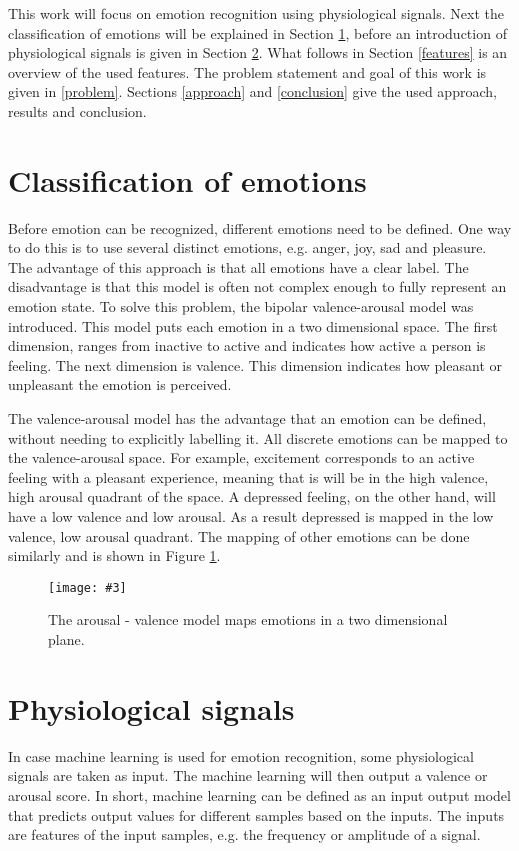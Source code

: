 \documentclass[12pt,journal,compsoc]{IEEEtran}
\newcommand{\npar}{\par \vspace{2.3ex plus 0.3ex minus 0.3ex}}
\newcommand{\mijnfiguur}[4][H]{            %
    \begin{figure}[#1]                      %
        \begin{center}                      %
            \texttt{[image: \#3]}        %
            \caption{#4\label{#3}}          %
        \end{center}
    \end{figure}
    }
\begin{document}
\npar

This work will focus on emotion recognition using physiological signals. Next the classification of emotions will be explained in Section \ref{classification}, before an introduction of physiological signals is given in Section \ref{phyintro}. What follows in Section \ref{features} is an overview of the used features. The problem statement and goal of this work is given in \ref{problem}. Sections \ref{approach} and \ref{conclusion} give the used approach, results and conclusion.

\section{Classification of emotions}\label{classification}
Before emotion can be recognized, different emotions need to be defined. One way to do this is to use several distinct emotions, e.g. anger, joy, sad and pleasure. The advantage of this approach is that all emotions have a clear label. The disadvantage is that this model is often not complex enough to fully represent an emotion state. To solve this problem, the bipolar valence-arousal model was introduced\cite{ExtendedPaper,RealTimeEEGEmotion}. This model puts each emotion in a two dimensional space. The first dimension, ranges from inactive to active and indicates how active a person is feeling. The next dimension is valence. This dimension indicates how pleasant or unpleasant the emotion is perceived. 

\npar

The valence-arousal model has the advantage that an emotion can be defined, without needing to explicitly labelling it. All discrete emotions can be mapped to the valence-arousal space. For example, excitement corresponds to an active feeling with a pleasant experience, meaning that is will be in the high valence, high arousal quadrant of the space. A depressed feeling, on the other hand, will have a low valence and low arousal. As a result depressed is mapped in the low valence, low arousal quadrant. The mapping of other emotions can be done similarly and is shown in Figure \ref{ArousalValenceModel}.

\mijnfiguur{width=0.5\textwidth}{ArousalValenceModel}{The arousal - valence model maps emotions in a two dimensional plane.\citep{ValArrFig}}

\section{Physiological signals} \label{phyintro}
In case machine learning is used for emotion recognition, some physiological signals are taken as input. The machine learning will then output a valence or arousal score. In short, machine learning can be defined as an input output model that predicts output values for different samples based on the inputs. The inputs are features of the input samples, e.g. the frequency or amplitude of a signal.
\end{document}
